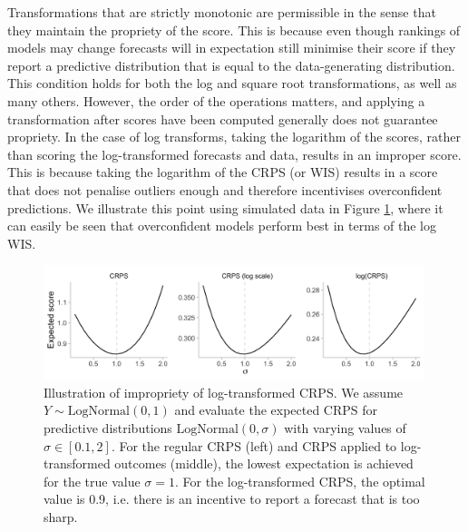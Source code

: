 \documentclass{article}
\begin{document}
Transformations that are strictly monotonic are permissible in the sense that they maintain the propriety of the score. This is because even though rankings of models may change forecasts will in expectation still minimise their score if they report a predictive distribution that is equal to the data-generating distribution. This condition holds for both the log and square root transformations, as well as many others. However, the order of the operations matters, and applying a transformation after scores have been computed generally does not guarantee propriety. In the case of log transforms, taking the logarithm of the scores, rather than scoring the log-transformed forecasts and data, results in an improper score. This is because taking the logarithm of the CRPS (or WIS) results in a score that does not penalise outliers enough and therefore incentivises overconfident predictions. We illustrate this point using simulated data in Figure \ref{fig:log-improper}, where it can easily be seen that overconfident models perform best in terms of the log WIS. 

\begin{figure}[h!]
    \centering
    \includegraphics[width=0.99\textwidth]{output/figures/example-log-first.png}
    \caption{Illustration of impropriety of log-transformed CRPS. We assume $Y \sim \text{LogNormal}(0, 1)$ and evaluate the expected CRPS for predictive distributions $\text{LogNormal}(0, \sigma)$ with varying values of $\sigma \in [0.1, 2]$. For the regular CRPS (left) and CRPS applied to log-transformed outcomes (middle), the lowest expectation is achieved for the true value $\sigma = 1$. For the log-transformed CRPS, the optimal value is  0.9, i.e. there is an incentive to report a forecast that is too sharp.}
    \label{fig:log-improper}
\end{figure}
\end{document}
